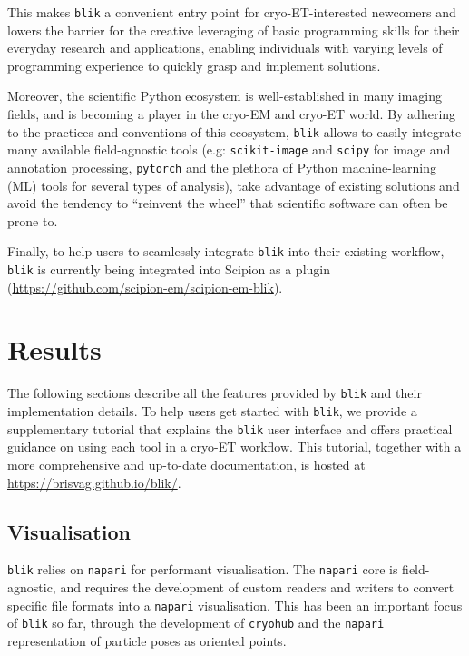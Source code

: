 This makes \texttt{blik} a convenient entry point for cryo-ET-interested newcomers and lowers the barrier for the creative leveraging of basic programming skills for their everyday research and applications, enabling individuals with varying levels of programming experience to quickly grasp and implement solutions.

Moreover, the scientific Python ecosystem is well-established in many imaging fields, and is becoming a player in the cryo-EM and cryo-ET world. By adhering to the practices and conventions of this ecosystem, \texttt{blik} allows to easily integrate many available field-agnostic tools (e.g: \texttt{scikit-image} and \texttt{scipy} for image and annotation processing, \texttt{pytorch} and the plethora of Python machine-learning (ML) tools for several types of analysis), take advantage of existing solutions and avoid the tendency to ``reinvent the wheel'' that scientific software can often be prone to.

\vspace{\baselineskip}

Finally, to help users to seamlessly integrate \texttt{blik} into their existing workflow, \texttt{blik} is currently being integrated into Scipion as a plugin (\url{https://github.com/scipion-em/scipion-em-blik}).

\section{Results}

The following sections describe all the features provided by \texttt{blik} and their implementation details. To help users get started with \texttt{blik}, we provide a supplementary tutorial that explains the \texttt{blik} user interface and offers practical guidance on using each tool in a cryo-ET workflow. This tutorial, together with a more comprehensive and up-to-date documentation, is hosted at \url{https://brisvag.github.io/blik/}.

\subsection{Visualisation}\label{visualisation}

\texttt{blik} relies on \texttt{napari} for performant visualisation. The \texttt{napari} core is field-agnostic, and requires the development of custom readers and writers to convert specific file formats into a \texttt{napari} visualisation. This has been an important focus of \texttt{blik} so far, through the development of \texttt{cryohub} and the \texttt{napari} representation of particle poses as oriented points.

